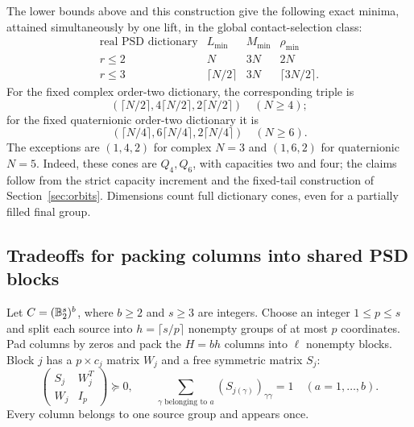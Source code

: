 The lower bounds above and this construction give the following exact
minima, attained simultaneously by one lift, in the global
contact-selection class:
\begin{equation}\label{res:small-real}
 \begin{array}{c|ccc}
 \text{real PSD dictionary}&L_{\min}&M_{\min}&\rho_{\min}\\\hline
 r\leq2&N&3N&2N\\
 r\leq3&\lceil N/2\rceil&3N&\lceil3N/2\rceil.
 \end{array}
\end{equation}
For the fixed complex order-two dictionary, the corresponding triple is
\begin{equation}\label{res:small-hermitian}
 (\lceil N/2\rceil,4\lceil N/2\rceil,2\lceil N/2\rceil)
 \quad(N\geq4);
\end{equation}
for the fixed quaternionic order-two dictionary it is
\[
 (\lceil N/4\rceil,6\lceil N/4\rceil,2\lceil N/4\rceil)
 \quad(N\geq6).
\]
The exceptions are $(1,4,2)$ for
complex $N=3$ and $(1,6,2)$ for quaternionic $N=5$. Indeed, these cones
are $Q_4,Q_6$, with capacities two and four; the claims follow from the
strict capacity increment and the fixed-tail construction of
Section~\ref{sec:orbits}. Dimensions count full dictionary cones, even
for a partially filled final group.

\subsection{Tradeoffs for packing columns into shared PSD blocks}
Let $C=(\mathbb B_2^s)^b$, where $b\geq2$ and $s\geq3$ are integers. Choose an integer
$1\leq p\leq s$ and split each source into $h=\lceil s/p\rceil$
nonempty groups of at most $p$ coordinates. Pad columns by zeros and
pack the $H=bh$ columns into $\ell$ nonempty blocks. Block $j$ has a
$p\times c_j$ matrix $W_j$ and a free symmetric matrix $S_j$:
\begin{equation}\label{res:packed-domain}
 \begin{pmatrix}S_j&W_j^T\\W_j&I_p\end{pmatrix}\succeq0,
 \qquad \sum_{\gamma\text{ belonging to }a}(S_{j(\gamma)})_{\gamma\gamma}=1
 \quad(a=1,\ldots,b).
\end{equation}
Every column belongs to one source group and appears once.

